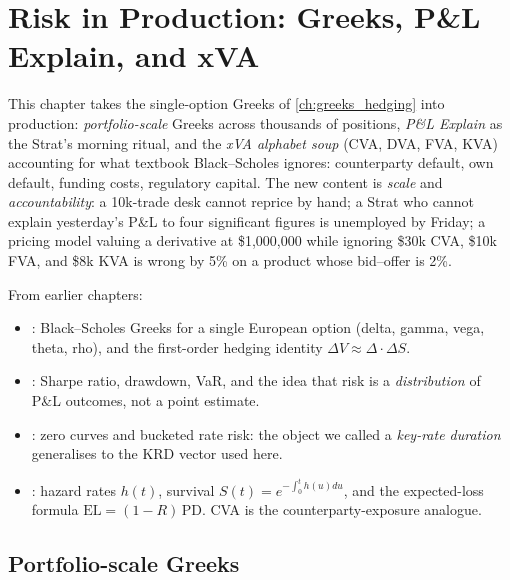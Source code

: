 \chapter{Risk in Production: Greeks, P\&L Explain, and xVA}
\label{ch:risk_production}

This chapter takes the single-option Greeks of
\cref{ch:greeks_hedging} into production: \emph{portfolio-scale}
Greeks across thousands of positions, \emph{P\&L Explain} as the
Strat's morning ritual, and the \emph{xVA alphabet soup} (CVA, DVA,
FVA, KVA) accounting for what textbook Black--Scholes ignores:
counterparty default, own default, funding costs, regulatory
capital.  The new content is \emph{scale} and \emph{accountability}:
a 10k-trade desk cannot reprice by hand; a Strat who cannot explain
yesterday's P\&L to four significant figures is unemployed by
Friday; a pricing model valuing a derivative at \$1{,}000{,}000
while ignoring \$30k CVA, \$10k FVA, and \$8k KVA is wrong by 5\%
on a product whose bid--offer is 2\%.

\begin{backgroundbox}[Prerequisites]
From earlier chapters:
\begin{itemize}
  \item {}: Black--Scholes Greeks for a single
    European option (delta, gamma, vega, theta, rho), and the
    first-order hedging identity $\Delta V \approx \Delta \cdot
    \Delta S$.
  \item {}: Sharpe ratio, drawdown, VaR, and the
    idea that risk is a \emph{distribution} of P\&L outcomes, not a
    point estimate.
  \item {}: zero curves and bucketed
    rate risk: the object we called a \emph{key-rate duration}
    generalises to the KRD vector used here.
  \item {}: hazard rates $h(t)$, survival
    $S(t) = e^{-\int_0^t h(u)du}$, and the expected-loss formula
    $\mathrm{EL} = (1-R)\,\mathrm{PD}$.  CVA is the
    counterparty-exposure analogue.
\end{itemize}
\end{backgroundbox}


\section{Portfolio-scale Greeks}
\label{sec:portfolio_greeks}

